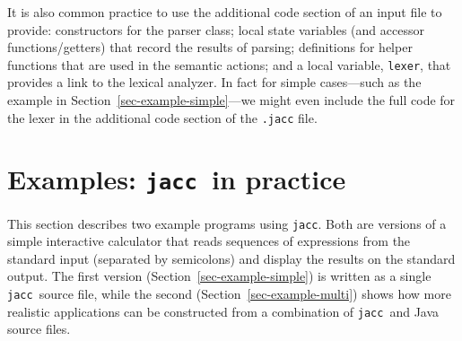\documentclass[12pt]{article}
\def\jacc{{\tt jacc}}
\begin{document}
It is also common practice to use the additional code section
of an input file to provide: constructors for the parser
class; local state variables (and accessor functions/getters)
that record the results of parsing; definitions for helper
functions that are used in the semantic actions; and a local
variable, \verb"lexer", that provides a link to the lexical
analyzer.  In fact for simple cases---such as the example in
Section~\ref{sec-example-simple}---we might even include the full code
for the lexer in the additional code section of the \verb".jacc"
file.

\section{Examples: \jacc\ in practice}\label{sec-example}
This section describes two example programs using \jacc.  Both are
versions of a simple interactive calculator that reads sequences of
expressions from the standard input (separated by semicolons) and
display the results on the standard output.  The first version
(Section~\ref{sec-example-simple}) is written as a single \jacc\ source
file, while the second (Section~\ref{sec-example-multi}) shows
how more realistic applications can be constructed from a
combination of \jacc\ and Java source files.

\end{document}
